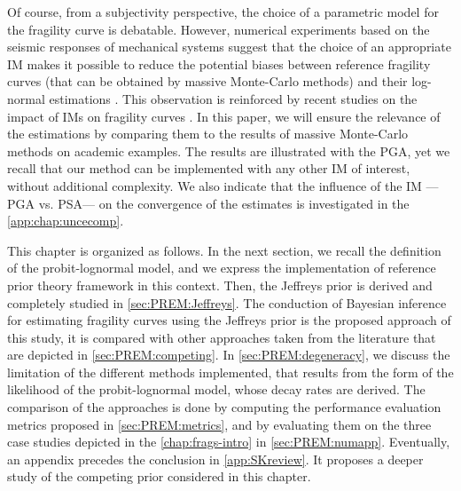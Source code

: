 Of course, from a subjectivity perspective, the choice of a parametric model for the fragility curve is debatable. However, numerical experiments based on the seismic responses of mechanical systems suggest that the choice of an appropriate IM makes it possible to reduce the potential biases between reference fragility curves (that can be obtained by massive Monte-Carlo methods) and their log-normal estimations \citep{gauchy_importance_2021}. This observation is reinforced by recent studies on the impact of IMs on fragility curves \citep{sainct_efficient_2020,ciano_role_2020,ciano_novel_2022}. In this paper, we will ensure the relevance of the estimations by comparing them to the results of massive Monte-Carlo methods on academic examples. 
The results are illustrated with the PGA, yet we recall that our method can be implemented with any other IM of interest, without additional complexity.
We also indicate that the influence of the IM ---PGA vs. PSA--- on the convergence of the estimates is investigated in the \cref{app:chap:uncecomp}.


This chapter is organized as follows. In the next section, we recall the definition of the probit-lognormal model, and we express the implementation of reference prior theory framework in this context.
Then, the Jeffreys prior is derived and completely studied in \cref{sec:PREM:Jeffreys}. The conduction of Bayesian inference for estimating fragility curves using the Jeffreys prior is the proposed approach of this study, it is compared with other approaches taken from the literature that are depicted in \cref{sec:PREM:competing}. %
In \cref{sec:PREM:degeneracy}, we discuss the limitation of the different methods implemented, that results from the form of the likelihood of the probit-lognormal model, whose decay rates are derived.
The comparison of the approaches is done by computing the performance evaluation metrics proposed in \cref{sec:PREM:metrics}, and by evaluating  them on the three case studies depicted in the \cref{chap:frags-intro} in \cref{sec:PREM:numapp}.
Eventually, an appendix precedes the conclusion in \cref{app:SKreview}. It proposes a deeper study of the competing prior considered in this chapter.





